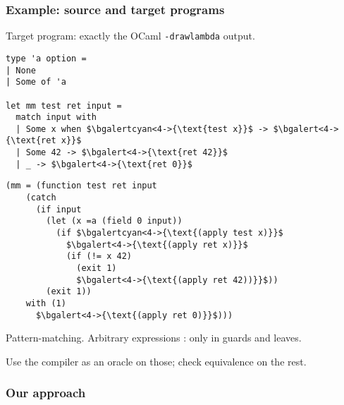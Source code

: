 \documentclass[dvipsnames,aspectratio=169]{beamer}
\begin{document}
\begin{frame}[fragile]
  \frametitle{Example: source and target programs}
  Target program: exactly the OCaml \texttt{-drawlambda} output.


\vfill

\begin{small}
  \hspace{-1em}
  \begin{minipage}{0.36\linewidth}
\begin{lstlisting}
type 'a option =
| None
| Some of 'a

let mm test ret input =
  match input with
  | Some x when $\bgalertcyan<4->{\text{test x}}$ -> $\bgalert<4->{\text{ret x}}$
  | Some 42 -> $\bgalert<4->{\text{ret 42}}$
  | _ -> $\bgalert<4->{\text{ret 0}}$
\end{lstlisting}
  \end{minipage}
  \hfill\pause
  \begin{minipage}{0.64\linewidth}
    \begin{lstlisting}
(mm = (function test ret input
    (catch
      (if input
        (let (x =a (field 0 input))
          (if $\bgalertcyan<4->{\text{(apply test x)}}$
            $\bgalert<4->{\text{(apply ret x)}}$
            (if (!= x 42)
              (exit 1)
              $\bgalert<4->{\text{(apply ret 42))}}$))
        (exit 1))
    with (1)
      $\bgalert<4->{\text{(apply ret 0)}}$)))
\end{lstlisting}
  \end{minipage}
\end{small}

\pause\vfill
Pattern-matching. Arbitrary expressions : \pause only in guards and leaves.

\pause\vfill

Use the compiler as an oracle on those;
check equivalence on the rest.
\end{frame}

\begin{frame}[fragile]
\frametitle{Our approach}

\vfill
\begin{center}
\end{center}
\vfill

\end{frame}
\end{document}
